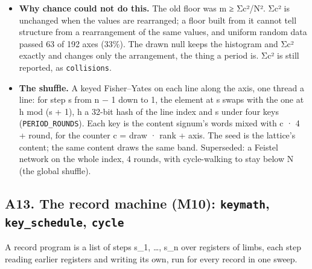 \begin{itemize}
\item \textbf{Why chance could not do this.} The old floor was m ≥ Σc²/N². Σc² is unchanged when the values are rearranged; a floor built from it cannot tell structure from a rearrangement of the same values, and uniform random data passed 63 of 192 axes (33\%). The drawn null keeps the histogram and Σc² exactly and changes only the arrangement, the thing a period is. Σc² is still reported, as \texttt{collisions}.
\item \textbf{The shuffle.} A keyed Fisher–Yates on each line along the axis, one thread a line: for step s from n − 1 down to 1, the element at s swaps with the one at h mod (s + 1), h a 32-bit hash of the line index and s under four keys (\texttt{PERIOD\_\allowbreak{}ROUNDS}). Each key is the content signum's words mixed with c · 4 + round, for the counter c = draw · rank + axis. The seed is the lattice's content; the same content draws the same band. Superseded: a Feistel network on the whole index, 4 rounds, with cycle-walking to stay below N (the global shuffle).
\end{itemize}

\subsection{\texorpdfstring{A13. The record machine (M10): \texttt{keymath}, \texttt{key\_\allowbreak{}schedule}, \texttt{cycle}}{A13. The record machine (M10): keymath, key\_schedule, cycle}}

A record program is a list of steps s\_\allowbreak{}1, …, s\_\allowbreak{}n over registers of limbs, each step reading earlier registers and writing its own, run for every record in one sweep.


